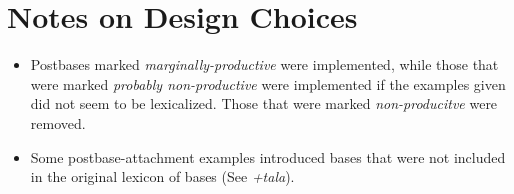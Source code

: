 \documentclass{article}
\begin{document}

\section{Notes on Design Choices}

\begin{itemize}
\renewcommand\labelitemi{$\cdot$}

\item Postbases marked \textit{marginally-productive} were implemented, while those that were marked \textit{probably non-productive} were implemented if the examples given did not seem to be lexicalized.
%
Those that were marked \textit{non-producitve} were removed.

\item Some postbase-attachment examples introduced bases that were not included in the original lexicon of bases (See \textit{+tala}).

\end{itemize}
\end{document}
